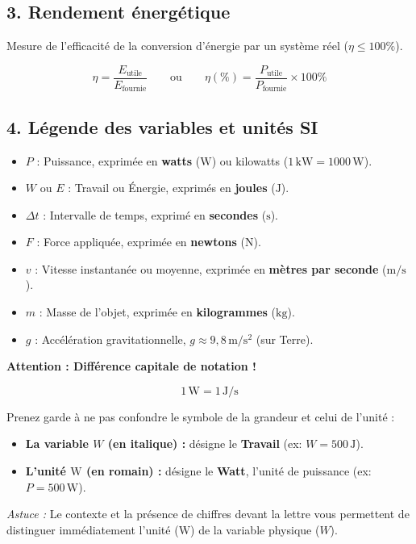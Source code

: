 \documentclass[11pt,openany]{book}
\begin{document}
\subsection*{3. Rendement énergétique}

Mesure de l'efficacité de la conversion d'énergie par un système réel ($\eta \le 100\%$).

\[
\boxed{\eta = \frac{E_{\mathrm{utile}}}{E_{\mathrm{fournie}}}} 
\qquad \text{ou} \qquad 
\boxed{\eta(\%) = \frac{P_{\mathrm{utile}}}{P_{\mathrm{fournie}}} \times 100\%}
\]

\subsection*{4. Légende des variables et unités SI}

\begin{itemize}
    \item $P$ : Puissance, exprimée en \textbf{watts} ($\mathrm{W}$) ou kilowatts ($\mathrm{1\,kW = 1000\,W}$).
    \item $W$ ou $E$ : Travail ou Énergie, exprimés en \textbf{joules} ($\mathrm{J}$).
    \item $\Delta t$ : Intervalle de temps, exprimé en \textbf{secondes} ($\mathrm{s}$).
    \item $F$ : Force appliquée, exprimée en \textbf{newtons} ($\mathrm{N}$).
    \item $v$ : Vitesse instantanée ou moyenne, exprimée en \textbf{mètres par seconde} ($\mathrm{m/s}$).
    \item $m$ : Masse de l'objet, exprimée en \textbf{kilogrammes} ($\mathrm{kg}$).
    \item $g$ : Accélération gravitationnelle, $g \approx 9{,}8\,\mathrm{m/s^2}$ (sur Terre).
\end{itemize}

\vspace{0.3cm}

\noindent\textbf{Attention : Différence capitale de notation !}

\[
\boxed{1\,\mathrm{W} = 1\,\mathrm{J/s}}
\]

\vspace{0.1cm}

\noindent Prenez garde à ne pas confondre le symbole de la grandeur et celui de l'unité :
\begin{itemize}
    \item \textbf{La variable $W$ (en italique) :} désigne le \textbf{Travail} (ex: $W = 500\,\mathrm{J}$).
    \item \textbf{L'unité $\mathrm{W}$ (en romain) :} désigne le \textbf{Watt}, l'unité de puissance (ex: $P = 500\,\mathrm{W}$).
\end{itemize}

\noindent\textit{Astuce :} Le contexte et la présence de chiffres devant la lettre vous permettent de distinguer immédiatement l'unité ($\mathrm{W}$) de la variable physique ($W$).
\end{document}
